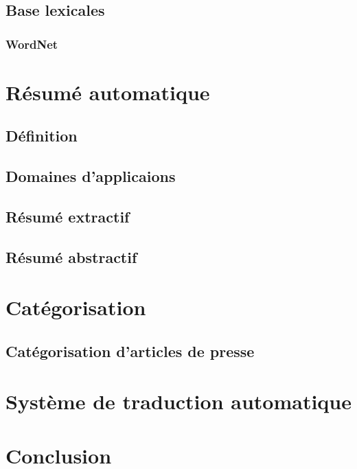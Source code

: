 \documentclass{report}
\begin{document}
    \subsection{Base lexicales}
        \subsubsection{WordNet}


\section{Résumé automatique}
    \subsection{Définition}
    \subsection{Domaines d'applicaions}

    \subsection{Résumé extractif}

    \subsection{Résumé abstractif}


\section{Catégorisation}
    \subsection{Catégorisation d'articles de presse}


\section{Système de traduction automatique}


\section{Conclusion}


\Large


\end{document}
